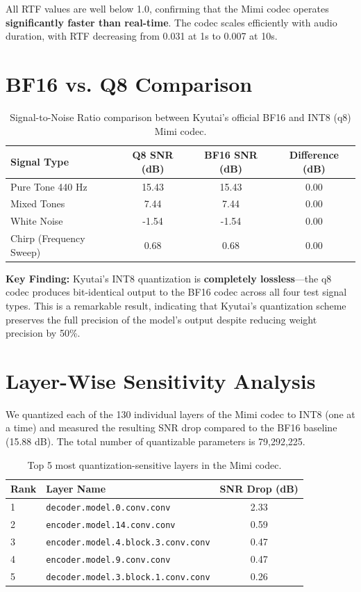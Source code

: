\documentclass[12pt,a4paper]{report}
\begin{document}
All RTF values are well below 1.0, confirming that the Mimi codec operates \textbf{significantly faster than real-time}. The codec scales efficiently with audio duration, with RTF decreasing from 0.031 at 1s to 0.007 at 10s.

\section{BF16 vs. Q8 Comparison}

\begin{table}[H]
\centering
\caption{Signal-to-Noise Ratio comparison between Kyutai's official BF16 and INT8 (q8) Mimi codec.}
\label{tab:bf16_vs_q8}
\begin{tabular}{@{}lccc@{}}
\toprule
\textbf{Signal Type} & \textbf{Q8 SNR (dB)} & \textbf{BF16 SNR (dB)} & \textbf{Difference (dB)} \\
\midrule
Pure Tone 440 Hz & 15.43 & 15.43 & 0.00 \\
Mixed Tones & 7.44 & 7.44 & 0.00 \\
White Noise & -1.54 & -1.54 & 0.00 \\
Chirp (Frequency Sweep) & 0.68 & 0.68 & 0.00 \\
\bottomrule
\end{tabular}
\end{table}

\textbf{Key Finding:} Kyutai's INT8 quantization is \textbf{completely lossless}---the q8 codec produces bit-identical output to the BF16 codec across all four test signal types. This is a remarkable result, indicating that Kyutai's quantization scheme preserves the full precision of the model's output despite reducing weight precision by 50\%.

\section{Layer-Wise Sensitivity Analysis}

We quantized each of the 130 individual layers of the Mimi codec to INT8 (one at a time) and measured the resulting SNR drop compared to the BF16 baseline (15.88 dB). The total number of quantizable parameters is 79,292,225.

\begin{table}[H]
\centering
\caption{Top 5 most quantization-sensitive layers in the Mimi codec.}
\label{tab:sensitive_layers}
\begin{tabular}{@{}llc@{}}
\toprule
\textbf{Rank} & \textbf{Layer Name} & \textbf{SNR Drop (dB)} \\
\midrule
1 & \texttt{decoder.model.0.conv.conv} & 2.33 \\
2 & \texttt{encoder.model.14.conv.conv} & 0.59 \\
3 & \texttt{encoder.model.4.block.3.conv.conv} & 0.47 \\
4 & \texttt{encoder.model.9.conv.conv} & 0.47 \\
5 & \texttt{decoder.model.3.block.1.conv.conv} & 0.26 \\
\bottomrule
\end{tabular}
\end{table}
\end{document}
